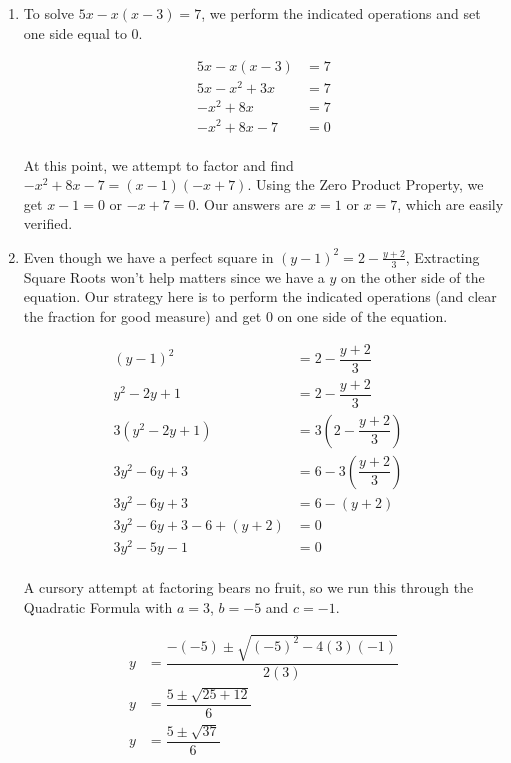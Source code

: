 \begin{ex}
\begin{enumerate}
\item To solve $5x - x(x-3) = 7$, we perform the indicated operations and set one side equal to $0$.

\begin{align*}
5x - x(x-3) & = 7 \\
5x - x^2 + 3x & = 7 \tag{Distribute} \\
-x^2 + 8x & = 7 \tag{Gather like terms} \\
-x^2 + 8x - 7 & = 0\tag{Subtract $7$} \\
\end{align*}

At this point, we attempt to factor and find $-x^2 + 8x - 7 = (x-1)(-x+7)$.  Using the Zero Product Property, we get $x-1 = 0$  or $-x+7 = 0$.  Our answers are $x = 1$ or $x = 7$, which are easily verified.

\item Even though we have a perfect square in $(y-1)^2 = 2 - \frac{y+2}{3}$, Extracting Square Roots won't help matters since we have a $y$ on the other side of the equation.  Our strategy here is to perform the indicated operations (and clear the fraction for good measure) and get $0$ on one side of the equation.

\begin{align*}
(y-1)^2 & =  2 - \dfrac{y+2}{3} \\
y^2 - 2y + 1 & = 2 - \dfrac{y+2}{3} \tag{Perfect Square Trinomial}\\
3(y^2 - 2y + 1) & = 3\left(2 - \dfrac{y+2}{3} \right) \tag{Multiply by $3$} \\
3y^2 - 6y + 3 & = 6 - 3\left(\dfrac{y+2}{3}\right) & \tag{Distribute} \\ 
3y^2 - 6y + 3 & = 6 - (y+2) \\
3y^2 - 6y + 3 - 6 + (y+2) & = 0 \tag{Subtract $6$, Add $(y+2)$}\\
3y^2 - 5y - 1 & = 0 \\
\end{align*}

A cursory attempt at factoring bears no fruit, so we run this through the Quadratic Formula with $a = 3$, $b = -5$ and $c = -1$.

\begin{align*}
y & = \dfrac{-(-5) \pm \sqrt{(-5)^2 - 4(3)(-1)}}{2(3)} \\
y & = \dfrac{5 \pm \sqrt{25 + 12}}{6} \\
y & = \dfrac{5 \pm \sqrt{37}}{6} \\
\end{align*}


\end{enumerate}
\end{ex}
